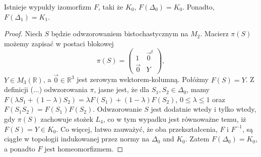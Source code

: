 \begin{Theorem}
\label{thm:Ball}
Istnieje wypukły izomorfizm $F$, taki że $K_{0}$, $F(\Delta_{0}) = K_{0}$.
Ponadto, $F(\Delta_{1}) = K_{1}$.
\end{Theorem}
\begin{proof}
Niech $S$ będzie odwzorowaniem bistochastycznym na $M_{2}$.
Macierz $\pi(S)$ możemy zapisać w postaci blokowej
\begin{equation}
\label{eq:Sbistochastic}
\pi(S) = \begin{pmatrix}
    1  &  \vec{0}^{t} \\
    \vec{0} & Y
    \end{pmatrix},
\end{equation}
$Y \in M_{3}(\mathbb{R})$,
a $\vec{0} \in \mathbb{R}^{3}$ jest zerowym wektorem-kolumną.
Połóżmy $F(S) = Y$.
Z definicji (...)
odwzorowania $\pi$,
jasne jest, że dla  $S_{1}, S_{2} \in \Delta_{0}$,
mamy $F \left( \lambda S_{1} + (1-\lambda) S_{2} \right) =
 \lambda F(S_{1}) + (1-\lambda) F(S_{2})$,
$0 \leq \lambda \leq 1$
oraz $F(S_{1} S_{2}) = F(S_{1}) F(S_{2})$.
Odwzorowanie $S$ jest dodatnie wtedy i tylko wtedy, gdy
$\pi(S)$ zachowuje stożek $L_{4}$,
co w tym wypadku jest równoważne temu, iż $F(S) = Y \in K_{0}$.
Co więcej, łatwo zauważyć, że oba przekształcenia, $F$ i $F^{-1}$,
są ciągłe w topologii indukowanej przez normy na
$\Delta_{0}$ and $K_{0}$.
Zatem $F(\Delta_{0}) = K_{0}$, a ponadto $F$ jest homeomorfizmem.


\end{proof}
